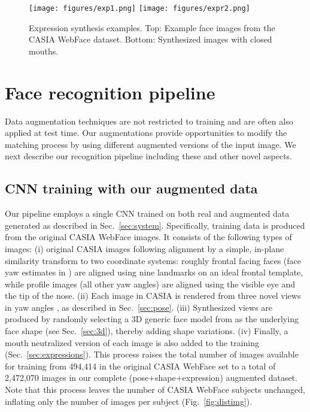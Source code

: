\documentclass[runningheads]{llncs}
\newcommand{\minisection}[1]{\vspace{0.04in} \noindent {\bf #1:} }
\begin{document}
\begin{figure}[t]
\centering
\texttt{[image: figures/exp1.png]}
\texttt{[image: figures/expr2.png]}
\caption{Expression synthesis examples. Top: Example face images from the CASIA WebFace dataset. Bottom: Synthesized images with closed mouths.}
\label{fig:expr}
\end{figure}



\section{Face recognition pipeline}\label{sec:cnn}
Data augmentation techniques are not restricted to training and are often also applied at test time. Our augmentations provide opportunities to modify the matching process by using different augmented versions of the input image. We next describe our recognition pipeline including these and other novel aspects. 

\subsection{CNN training with our augmented data}\label{sec:training}

\minisection{Augmented training data}
Our pipeline employs a single CNN trained on both real and augmented data generated as described in Sec.~\ref{sec:system}. Specifically, training data is produced from the original CASIA WebFace images. It consists of the following types of images: (i) original CASIA images following alignment by a simple, in-plane similarity transform to two coordinate systems: roughly frontal facing faces (face yaw estimates in ) are aligned using nine landmarks on an ideal frontal template, while profile images (all other yaw angles) are aligned using the visible eye and the tip of the nose. (ii) Each image in CASIA is rendered from three novel views in yaw angles , as described in Sec.~\ref{sec:pose}. (iii) Synthesized views are produced by randomly selecting a 3D generic face model from  as the underlying face shape (see Sec.~\ref{sec:3d}), thereby adding shape variations. (iv) Finally, a mouth neutralized version of each image is also added to the training (Sec.~\ref{sec:expressions}). This process raises the total number of images available for training from 494,414 in the original CASIA WebFace set to a total of 2,472,070 images in our complete (pose+shape+expression) augmented dataset. Note that this process leaves the number of CASIA WebFace subjects unchanged, inflating only the number of images per subject (Fig.~\ref{fig:distimg}). 
\end{document}
